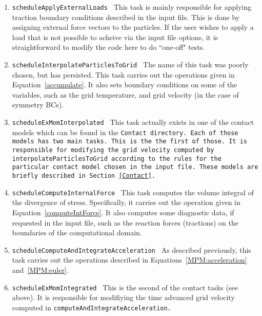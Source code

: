 \begin{enumerate}
\item {\tt scheduleApplyExternalLoads \normalfont} This task is mainly responsible for
applying traction boundary conditions described in the input file.  This is
done by assigning external force vectors to the particles.  If the user
wishes to apply a load that is not possible to acheive via the input file
options, it is straightforward to modify the code here to do ``one-off" tests.

\item {\tt scheduleInterpolateParticlesToGrid \normalfont}   The name of this task was
poorly chosen, but has persisted.  This task carries out the operations given
in Equation~\ref{accumulate}.  It also sets boundary conditions on some of
the variables, such as the grid temperature, and grid velocity 
(in the case of symmetry BCs).

\item {\tt scheduleExMomInterpolated \normalfont}  This task actually exists in one
of the contact models which can be found in the \tt Contact \normalfont directory.  Each of those
models has two main tasks. This is the the first of those. It is responsible
for modifying the grid velocity computed by interpolateParticlesToGrid according
to the rules for the particular contact model chosen in the input file.  These
models are briefly described in Section~\ref{Contact}. 

\item {\tt scheduleComputeInternalForce \normalfont} This task computes the volume
integral of the divergence of stress.  Specifically, it carries out the
operation given in Equation~\ref{computeIntForce}.  It also computes some
diagnostic data, if requested in the input file, such as the reaction forces
(tractions) on the boundaries of the computational domain.

\item {\tt scheduleComputeAndIntegrateAcceleration \normalfont} As described previously,
this task carries out the operations described in 
Equations~\ref{MPM:acceleration} and~\ref{MPM:euler}.

\item {\tt scheduleExMomIntegrated \normalfont}  This is the second of the contact tasks
(see above).  It is responsible for modifiying the time advanced grid velocity
computed in \tt computeAndIntegrateAcceleration. \normalfont


\end{enumerate}
